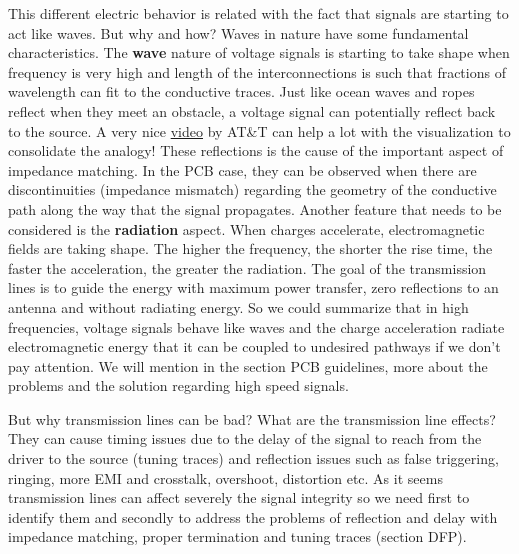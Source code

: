 \documentclass[final]{cubedoc}
\begin{document}
	
	
	This different electric behavior is related with the fact that signals are starting to act like waves. But why and how?
	Waves in nature have some fundamental characteristics. The \textbf{wave} nature of voltage signals is starting to take shape when frequency is very high and length of the interconnections is such that fractions of wavelength can fit to the conductive traces. Just like ocean waves and ropes reflect when they meet an obstacle, a voltage signal can potentially reflect back to the source. A very nice \href{https://www.youtube.com/watch?v=DovunOxlY1k}{video} by AT\&T can help a lot with the visualization to consolidate the analogy! These reflections is the cause of the important aspect of impedance matching. In the PCB case, they can be observed when there are discontinuities (impedance mismatch) regarding the geometry of the conductive path along the way that the signal propagates. Another feature that needs to be considered is the \textbf{radiation} aspect. When charges accelerate, electromagnetic fields are taking shape. The higher the frequency, the shorter the rise time, the faster the acceleration, the greater the radiation. The goal of the transmission lines is to guide the energy with maximum power transfer, zero reflections to an antenna and without radiating energy. So we could summarize that in high frequencies, voltage signals behave like waves and the charge acceleration radiate electromagnetic energy that it can be coupled to undesired pathways if we don't pay attention. We will mention in the section PCB guidelines, more about the problems and the solution regarding high speed signals.
	
	But why transmission lines can be bad? What are the transmission line effects? They can cause timing issues due to the delay of the signal to reach from the driver to the source (tuning traces) and reflection issues such as false triggering, ringing, more EMI and crosstalk, overshoot, distortion etc. As it seems transmission lines can affect severely the signal integrity so we need first to identify them and secondly to address the problems of reflection and delay with impedance matching, proper termination and tuning traces (section DFP).
	
\end{document}
